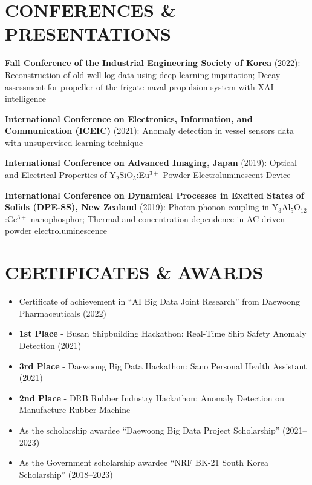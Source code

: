 \documentclass[10pt,a4paper]{article}
\begin{document}
\vspace{2pt}

\section*{CONFERENCES \& PRESENTATIONS}

\textbf{Fall Conference of the Industrial Engineering Society of Korea} (2022): Reconstruction of old well log data using deep learning imputation; Decay assessment for propeller of the frigate naval propulsion system with XAI intelligence

\textbf{International Conference on Electronics, Information, and Communication (ICEIC)} (2021): Anomaly detection in vessel sensors data with unsupervised learning technique

\textbf{International Conference on Advanced Imaging, Japan} (2019): Optical and Electrical Properties of Y$_2$SiO$_5$:Eu$^{3+}$ Powder Electroluminescent Device

\textbf{International Conference on Dynamical Processes in Excited States of Solids (DPE-SS), New Zealand} (2019): Photon-phonon coupling in Y$_3$Al$_5$O$_{12}$:Ce$^{3+}$ nanophosphor; Thermal and concentration dependence in AC-driven powder electroluminescence

\vspace{2pt}

\section*{CERTIFICATES \& AWARDS}

\begin{itemize}
    \item Certificate of achievement in ``AI Big Data Joint Research'' from Daewoong Pharmaceuticals (2022)
    \item \textbf{1st Place} - Busan Shipbuilding Hackathon: Real-Time Ship Safety Anomaly Detection (2021)
    \item \textbf{3rd Place} - Daewoong Big Data Hackathon: Sano Personal Health Assistant (2021)
    \item \textbf{2nd Place} - DRB Rubber Industry Hackathon: Anomaly Detection on Manufacture Rubber Machine
    \item As the scholarship awardee ``Daewoong Big Data Project Scholarship'' (2021--2023)
    \item As the Government scholarship awardee ``NRF BK-21 South Korea Scholarship'' (2018--2023)
\end{itemize}
\end{document}
